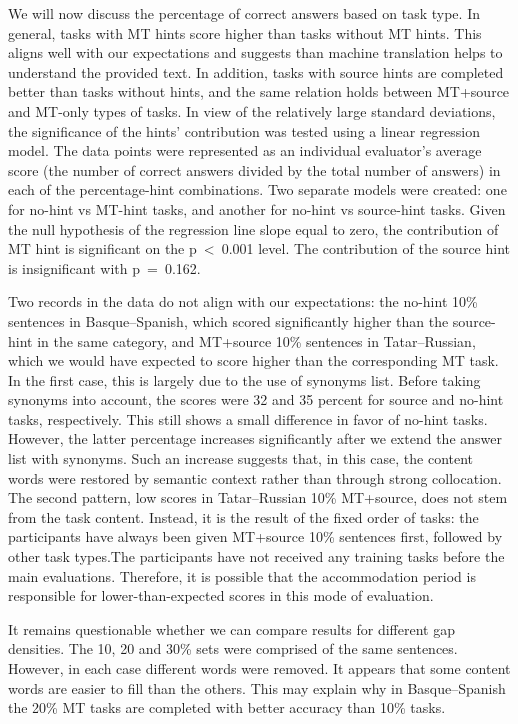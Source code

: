 \documentclass[11pt]{article}
\newcommand{\comment}[1]{}
\begin{document}
We will now discuss the percentage of correct answers based on task type. In general, tasks with MT hints score higher than tasks without MT hints. This aligns well with our expectations and suggests than machine translation helps to understand the provided text. In addition, tasks with source hints are completed better than tasks without hints, and the same relation holds between MT+source and MT-only types of tasks. In view of the relatively large standard deviations, the significance of the hints' contribution was tested using a linear regression model. The data points were represented as an individual evaluator's average score (the number of correct answers divided by the total number of answers) in each of the percentage-hint combinations. Two separate models were created: one for no-hint vs MT-hint tasks, and another for no-hint vs source-hint tasks. Given the null hypothesis of the regression line slope equal to zero, the contribution of MT hint is significant on the p~<~0.001 level. The contribution of the source hint is insignificant with p~=~0.162.

Two records in the data do not align with our expectations: the no-hint 10\% sentences in Basque--Spanish, which scored significantly higher than the source-hint in the same category, and MT+source 10\% sentences in Tatar--Russian, which we would have expected to score higher than the corresponding MT task. In the first case, this is largely due to the use of synonyms list. Before taking synonyms into account, the scores were 32 and 35 percent for source and no-hint tasks, respectively. This still shows a small difference in favor of no-hint tasks. However, the latter percentage increases significantly after we extend the answer list with synonyms. Such an increase suggests that, in this case, the content words were restored by 
semantic context rather than through strong collocation. The second pattern, low scores in Tatar--Russian 10\% MT+source, does not stem from the task content. Instead, it is the result of the fixed order of tasks: the participants have always been given MT+source 10\% sentences first, followed by other task types.\comment{MLF: Why? Not random? \cite{oregan13} did random! Why was this changed?}The participants have not received any training tasks before the main evaluations. Therefore, it is possible that the accommodation period is responsible for lower-than-expected scores in this mode of evaluation. 

It remains questionable whether we can compare results for different gap densities. The 10, 20 and 30\% sets were comprised
of the same sentences. However, in each case different words were removed. It appears
that some content words are easier to fill than the others. This may explain why in
Basque--Spanish the 20\% MT tasks are completed with better accuracy than 10\% tasks.\comment{MLF: I think this shows that our statistics are weak, should we say something to excuse ourselves?}
\end{document}
